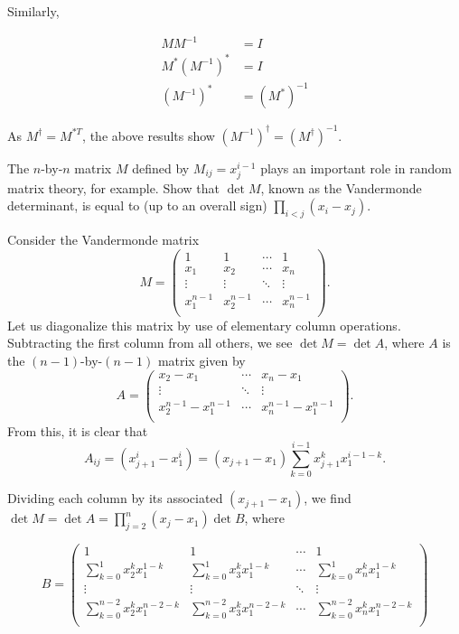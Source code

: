 \documentclass[../group-theory-in-a-nutshell-for-physicists.tex]{subfiles}
\begin{document}
\begin{questions}
\begin{solution}
Similarly,

\begin{align*}
MM^{- 1} &= I \\
M^{*}(M^{- 1})^{*} &= I \\
(M^{- 1})^{*} &= (M^{*})^{- 1}
\end{align*}

As $M^{\dagger} = M^{*T}$, the above results show
$(M^{- 1})^{\dagger} = (M^{\dagger})^{- 1}$.
\end{solution}

\question The $n$-by-$n$ matrix $M$ defined by $M_{ij} = x_{j}^{i - 1}$
plays an important role in random matrix theory, for example. Show that
$\det M$, known as the Vandermonde determinant, is equal to (up to an
overall sign) $\prod_{i < j}(x_{i} - x_{j})$.

\begin{solution}
Consider the Vandermonde matrix
\[
M = \begin{pmatrix}
1 & 1 & \cdots & 1 \\
x_{1} & x_{2} & \cdots & x_{n} \\
 \vdots & \vdots & \ddots & \vdots \\
x_{1}^{n - 1} & x_{2}^{n - 1} & \cdots & x_{n}^{n - 1} \\
\end{pmatrix}.
\]
Let us diagonalize this matrix by use of elementary column operations.
Subtracting the first column from all others, we see $\det M = \det A$, where $A$ is the $(n-1)$-by-$(n-1)$ matrix given by
\[
A = \begin{pmatrix}
x_{2} - x_{1} & \cdots & x_{n} - x_{1} \\
 \vdots & \ddots & \vdots \\
x_{2}^{n - 1} - x_{1}^{n - 1} & \cdots & x_{n}^{n - 1} - x_{1}^{n - 1} \\
\end{pmatrix}.
\]
From this, it is clear that
\[
A_{ij} = (x_{j+1}^{i} - x_{1}^{i}) = (x_{j+1} - x_{1})\sum_{k = 0}^{i - 1}x_{j+1}^{k}x_{1}^{i - 1 - k}.
\]

Dividing each column by its associated $(x_{j+1} - x_{1})$, we find
$\det M = \det A = \prod_{j = 2}^{n}(x_{j} - x_{1})\det B$, where

\[
B = \begin{pmatrix}
1 & 1 & \cdots & 1 \\
\sum_{k = 0}^{1}x_{2}^{k}x_{1}^{1 - k} & \sum_{k = 0}^{1}x_{3}^{k}x_{1}^{1 - k} & \cdots & \sum_{k = 0}^{1}x_{n}^{k}x_{1}^{1 - k} \\
 \vdots & \vdots & \ddots & \vdots \\
\sum_{k = 0}^{n - 2}x_{2}^{k}x_{1}^{n - 2 - k} & \sum_{k = 0}^{n - 2}x_{3}^{k}x_{1}^{n - 2 - k} & \cdots & \sum_{k = 0}^{n - 2}x_{n}^{k}x_{1}^{n - 2 - k} \\
\end{pmatrix}
\]


\end{solution}
\end{questions}
\end{document}
